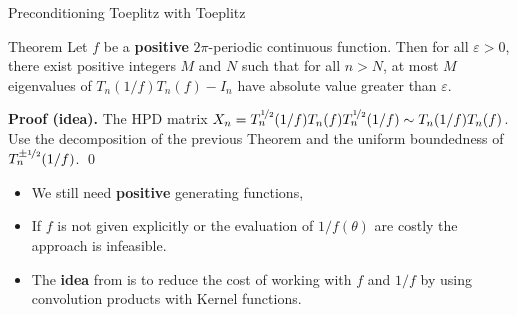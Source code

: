 \documentclass[aspectratio=169,xcolor=dvipsnames]{beamer}
\begin{document}
\begin{frame}{Preconditioning Toeplitz with Toeplitz}

\begin{alertblock}{Theorem \parencite{MR1230358}}
Let $f$ be a \textbf{positive} $2\pi$-periodic continuous function. Then for all $\varepsilon > 0$, there exist positive integers $M$ and $N$ such that for all $n > N$, at most $M$ eigenvalues of $T_n(1/f)T_n(f) - I_n$ have absolute value greater than $\varepsilon$.
\end{alertblock}

\textbf{Proof (idea).} The HPD matrix $X_n = T_n^{\nicefrac{1}{2}}(1/f) T_n(f) T_n^{\nicefrac{1}{2}}(1/f) \sim T_n(1/f)T_n(f)$. Use the decomposition of the previous Theorem and the uniform boundedness of~$T_n^{\pm\nicefrac{1}{2}}(1/f)$. \qed

\begin{itemize}
	\item[\faBomb]<2-> We still need \textbf{positive} generating functions,
	\item[\faCogs]<3-> If $f$ is not given explicitly or the evaluation of $1/f(\theta)$ are costly the approach is infeasible.
	\item[{\faLightbulb[regular]}]<4-> The \textbf{idea} from \parencite{MR1230358} is to reduce the cost of working with $f$ and $1/f$ by using convolution products with Kernel functions.
\end{itemize}

\end{frame}
\end{document}
